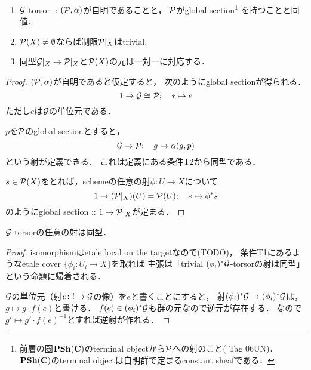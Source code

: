 \documentclass[a4paper, dvipdfmx]{jsarticle}
\begin{document}
\begin{Lemma}
    \enumfix
    \begin{enumerate}
        \item 
        $\mathcal{G}$-torsor :: $(\mathcal{P}, \alpha)$が自明であることと，
        $\mathcal{P}$がglobal section\footnote
        {
            前層の圏$\mathbf{PSh}(\mathbf{C})$のterminal objectから$\mathcal{P}$への射のこと(\cite{StacksProj} Tag 06UN)．
            $\mathbf{PSh}(\mathbf{C})$のterminal objectは自明群で定まるconstant sheafである．
        }
        を持つことと同値．

        \item $\mathcal{P}(X) \neq \emptyset$ならば制限$\mathcal{P}|_{X}$はtrivial.

        \item 同型$\mathcal{G}|_{X} \to \mathcal{P}|_{X}$と$\mathcal{P}(X)$の元は一対一に対応する．
    \end{enumerate}
\end{Lemma}
\begin{proof}
    $(\mathcal{P}, \alpha)$が自明であると仮定すると，
    次のようにglobal sectionが得られる．
    \[ 1 \to \mathcal{G} \cong \mathcal{P}; \quad * \mapsto e \]
    ただし$e$は$\mathcal{G}$の単位元である．

    $p$を$\mathcal{P}$のglobal sectionとすると，
    \[ \mathcal{G} \to \mathcal{P}; \quad g \mapsto \alpha(g, p) \]
    という射が定義できる．
    これは定義にある条件T2から同型である．

    $s \in \mathcal{P}(X)$をとれば，schemeの任意の射$\phi \colon U \to X$について
    \[ 1 \to (\mathcal{P}|_{X})(U)=\mathcal{P}(U);\quad * \mapsto \phi^*s \]
    のようにglobal section :: $1 \to \mathcal{P}|_{X}$が定まる．
\end{proof}

\begin{Cor}
    $\mathcal{G}$-torsorの任意の射は同型．
\end{Cor}
\begin{proof}
    isomorphismはetale local on the targetなので(TODO)，
    条件T1にあるようなetale cover $\{\phi_i \colon U_i \to X\}$を取れば
    主張は「trivial $(\phi_i)^*\mathcal{G}$-torsorの射は同型」という命題に帰着される．

    $\mathcal{G}$の単位元（射$e \colon ! \to \mathcal{G}$の像）を$e$と書くことにすると，
    射$(\phi_i)^*\mathcal{G} \to (\phi_i)^*\mathcal{G}$は，$g \mapsto g \cdot f(e)$と書ける．
    $f(e) \in (\phi_i)^*\mathcal{G}$も群の元なので逆元が存在する．
    なので$g' \mapsto g' \cdot f(e)^{-1}$とすれば逆射が作れる．
\end{proof}
\end{document}
